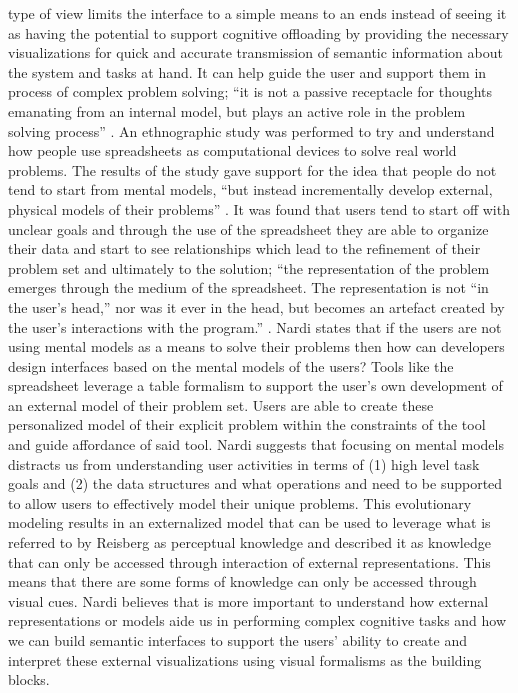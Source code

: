 \documentclass{sig-alternate}
\begin{document}
type of view limits the interface to a simple means to an ends instead of seeing
it as having the potential to support cognitive offloading by providing the
necessary visualizations for quick and accurate transmission of semantic
information about the system and tasks at hand. It can help guide the user and
support them in process of complex problem solving; ``it is not a passive
receptacle for thoughts emanating from an internal model, but plays an active
role in the problem solving process'' \cite{Nardi:BeyondModels}. An ethnographic
study was performed to try and understand how people use spreadsheets as
computational devices to solve real world problems. The results of the study
gave support for the idea that people do not tend to start from mental models,
``but instead incrementally develop external, physical models of their
problems'' \cite{Nardi:BeyondModels}. It was found that users tend to start off
with unclear goals and through the use of the spreadsheet they are able to
organize their data and start to see relationships which lead to the refinement
of their problem set and ultimately to the solution; ``the representation of the
problem emerges through the medium of the spreadsheet. The representation is not
``in the user's head,'' nor was it ever in the head, but becomes an artefact
created by the user's interactions with the program.''
\cite{Nardi:BeyondModels}. Nardi states that if the users are not using mental
models as a  means to solve their problems then how can developers design
interfaces based on the mental models of the users? Tools like the spreadsheet
leverage a table formalism to support the user's own development of an external
model of their problem set. Users are able to create these personalized model of
their explicit problem within the constraints of the tool and guide affordance
of said tool. Nardi suggests that focusing on mental models distracts us from
understanding user activities in terms of (1) high level task goals and (2) the
data structures and  what operations and need to be supported to allow users to
effectively model their unique problems. This evolutionary modeling results in
an externalized model that can be used to leverage what is referred to by
Reisberg \cite{Reisberg:ExternalRepresentations} as perceptual knowledge and
described it as knowledge that can only be accessed  through interaction of
external representations. This means that there are some forms of knowledge can
only be accessed through visual cues. Nardi believes that is more important to
understand how external representations or models aide us in performing complex
cognitive tasks and how we can build semantic interfaces to support the users'
ability to create and interpret these external visualizations using visual
formalisms as the building blocks.
\end{document}
